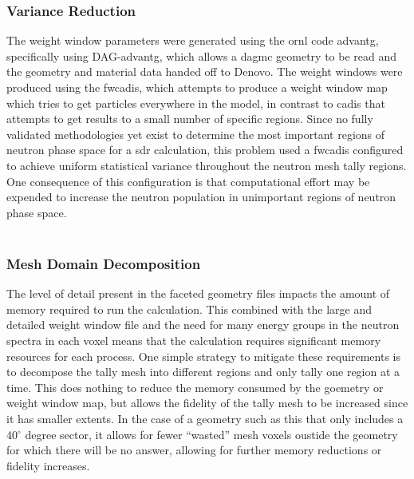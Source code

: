 \documentclass[12pt]{article}
\begin{document}
\subsubsection{Variance Reduction}
The weight window parameters were generated using the \gls{ornl} code
\gls{advantg}, specifically using DAG-\gls{advantg}, which allows a
\gls{dagmc} geometry to be read and the geometry and material data handed off to
Denovo. The weight windows were produced using the \gls{fwcadis},
which attempts to produce a weight window map which tries to get particles
everywhere in the model, in contrast to \gls{cadis} that
attempts to get results to a small number of specific regions.  Since no 
fully validated methodologies yet exist to determine the most important regions of
neutron phase space for a \gls{sdr} calculation, this problem used a \gls{fwcadis}
configured to achieve uniform statistical variance throughout the neutron mesh
tally regions.  One consequence of this configuration is that computational
effort may be expended to increase the neutron population in unimportant regions 
of neutron phase space.
\\
\\
\subsubsection{Mesh Domain Decomposition}
The level of detail present in the faceted geometry files impacts the amount
of memory required to run the calculation.  This combined with the large and
detailed weight window file and the need for many energy groups in the neutron
spectra in each voxel means that the calculation requires significant memory
resources for each process.  One simple strategy to mitigate these
requirements is to decompose the tally mesh into different regions and only
tally one region at a time.  This does nothing to reduce the memory consumed
by the goemetry or weight window map, but allows the fidelity of the tally
mesh to be increased since it has smaller extents.  In the case of a geometry
such as this that only includes a 40$^\circ$ degree sector, it allows for
fewer ``wasted'' mesh voxels oustide the geometry for which there will be no
answer, allowing for further memory reductions or fidelity increases.
\end{document}
